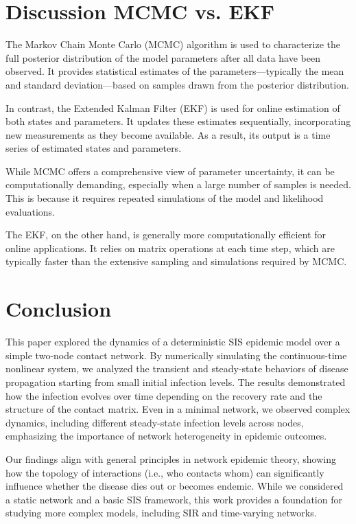 \documentclass[a4paper,10pt]{report}
\begin{document}
\section{Discussion MCMC vs. EKF}

The Markov Chain Monte Carlo (MCMC) algorithm is used to characterize the full posterior distribution of the model parameters after all data have been observed. It provides statistical estimates of the parameters—typically the mean and standard deviation—based on samples drawn from the posterior distribution.

In contrast, the Extended Kalman Filter (EKF) is used for online estimation of both states and parameters. It updates these estimates sequentially, incorporating new measurements as they become available. As a result, its output is a time series of estimated states and parameters.

While MCMC offers a comprehensive view of parameter uncertainty, it can be computationally demanding, especially when a large number of samples is needed. This is because it requires repeated simulations of the model and likelihood evaluations.

The EKF, on the other hand, is generally more computationally efficient for online applications. It relies on matrix operations at each time step, which are typically faster than the extensive sampling and simulations required by MCMC.
\section{Conclusion}

This paper explored the dynamics of a deterministic SIS epidemic model over a simple two-node contact network. By numerically simulating the continuous-time nonlinear system, we analyzed the transient and steady-state behaviors of disease propagation starting from small initial infection levels. The results demonstrated how the infection evolves over time depending on the recovery rate and the structure of the contact matrix. Even in a minimal network, we observed complex dynamics, including different steady-state infection levels across nodes, emphasizing the importance of network heterogeneity in epidemic outcomes.

Our findings align with general principles in network epidemic theory, showing how the topology of interactions (i.e., who contacts whom) can significantly influence whether the disease dies out or becomes endemic. While we considered a static network and a basic SIS framework, this work provides a foundation for studying more complex models, including SIR and time-varying networks.
\end{document}
